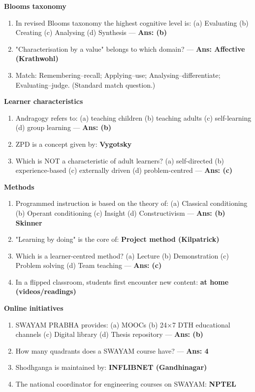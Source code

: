 \textbf{Bloom\textquotesingle s taxonomy}

\begin{enumerate}
\def\labelenumi{\arabic{enumi}.}
\setcounter{enumi}{3}
\tightlist
\item
  In revised Bloom\textquotesingle s taxonomy the highest cognitive level is: (a) Evaluating (b) Creating (c) Analysing (d) Synthesis --- \textbf{Ans: (b)}
\item
  "Characterisation by a value" belongs to which domain? --- \textbf{Ans: Affective (Krathwohl)}
\item
  Match: Remembering--recall; Applying--use; Analysing--differentiate; Evaluating--judge. (Standard match question.)
\end{enumerate}

\textbf{Learner characteristics}

\begin{enumerate}
\def\labelenumi{\arabic{enumi}.}
\setcounter{enumi}{6}
\tightlist
\item
  Andragogy refers to: (a) teaching children (b) teaching adults (c) self-learning (d) group learning --- \textbf{Ans: (b)}
\item
  ZPD is a concept given by: \textbf{Vygotsky}
\item
  Which is NOT a characteristic of adult learners? (a) self-directed (b) experience-based (c) externally driven (d) problem-centred --- \textbf{Ans: (c)}
\end{enumerate}

\textbf{Methods}

\begin{enumerate}
\def\labelenumi{\arabic{enumi}.}
\setcounter{enumi}{9}
\tightlist
\item
  Programmed instruction is based on the theory of: (a) Classical conditioning (b) Operant conditioning (c) Insight (d) Constructivism --- \textbf{Ans: (b) Skinner}
\item
  "Learning by doing" is the core of: \textbf{Project method (Kilpatrick)}
\item
  Which is a learner-centred method? (a) Lecture (b) Demonstration (c) Problem solving (d) Team teaching --- \textbf{Ans: (c)}
\item
  In a flipped classroom, students first encounter new content: \textbf{at home (videos/readings)}
\end{enumerate}

\textbf{Online initiatives}

\begin{enumerate}
\def\labelenumi{\arabic{enumi}.}
\setcounter{enumi}{13}
\tightlist
\item
  SWAYAM PRABHA provides: (a) MOOCs (b) 24×7 DTH educational channels (c) Digital library (d) Thesis repository --- \textbf{Ans: (b)}
\item
  How many quadrants does a SWAYAM course have? --- \textbf{Ans: 4}
\item
  Shodhganga is maintained by: \textbf{INFLIBNET (Gandhinagar)}
\item
  The national coordinator for engineering courses on SWAYAM: \textbf{NPTEL}
\end{enumerate}


